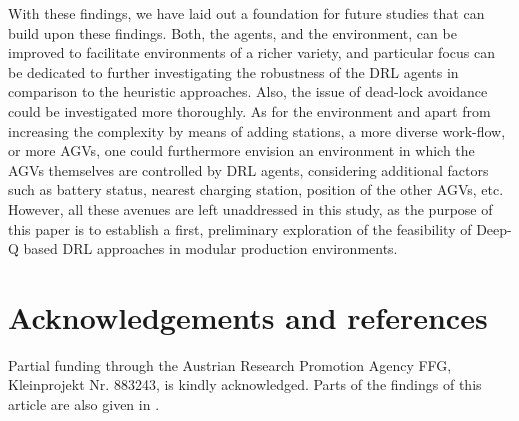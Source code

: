 \documentclass[sn-mathphys]{sn-jnl}
\begin{document}
With these findings, we have laid out a foundation for future studies that can build upon these findings. Both, the agents, and the environment, can be improved to facilitate environments of a richer variety, and particular focus can be dedicated to further investigating the robustness of the DRL agents in comparison to the heuristic approaches. Also, the issue of dead-lock avoidance could be investigated more thoroughly. As for the environment and apart from increasing the complexity by means of adding stations, a more diverse work-flow, or more AGVs, one could furthermore envision an environment in which the AGVs themselves are controlled by DRL agents, considering additional factors such as battery status, nearest charging station, position of the other AGVs, etc. However, all these avenues are left unaddressed in this study, as the purpose of this paper is to establish a first, preliminary exploration of the feasibility of Deep-Q based DRL approaches in modular production environments.

\section{Acknowledgements and references}
\label{sec:acknowledgements}
Partial funding through the Austrian Research Promotion Agency FFG, Kleinprojekt Nr. 883243, is kindly acknowledged.
Parts of the findings of this article are also given in \cite{Hasenbichler2021}.


\end{document}
